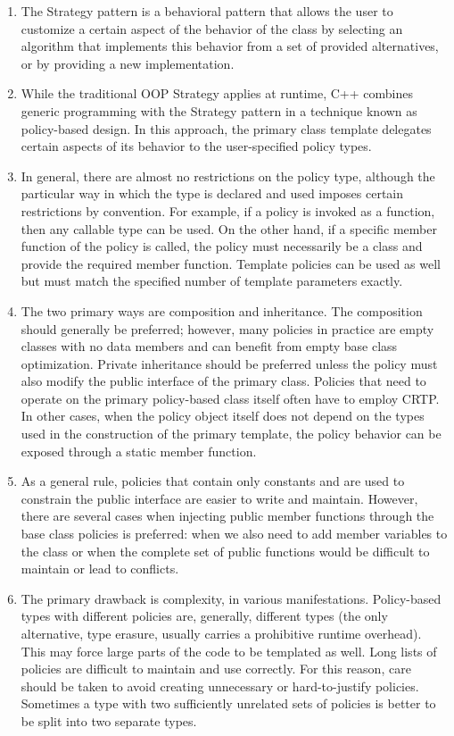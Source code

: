 \begin{enumerate}
\item
  The Strategy pattern is a behavioral pattern that allows the user to customize a certain aspect of the behavior of the class by selecting an algorithm that implements this behavior from a set of provided alternatives, or by providing a new implementation.
\item
  While the traditional OOP Strategy applies at runtime, C++ combines generic programming with the Strategy pattern in a technique known as policy-based design. In this approach, the primary class template delegates certain aspects of its behavior to the user-specified policy types.
\item
  In general, there are almost no restrictions on the policy type, although the particular way in which the type is declared and used imposes certain restrictions by convention. For example, if a policy is invoked as a function, then any callable type can be used. On the other hand, if a specific member function of the policy is called, the policy must necessarily be a class and provide the required member function. Template policies can be used as well but must match the specified number of template parameters exactly.
\item
  The two primary ways are composition and inheritance. The composition should generally be preferred; however, many policies in practice are empty classes with no data members and can benefit from empty base class optimization. Private inheritance should be preferred unless the policy must also modify the public interface of the primary class. Policies that need to operate on the primary policy-based class itself often have to employ CRTP. In other cases, when the policy object itself does not depend on the types used in the construction of the primary template, the policy behavior can be exposed through a static member function.
\item
  As a general rule, policies that contain only constants and are used to constrain the public interface are easier to write and maintain. However, there are several cases when injecting public member functions through the base class policies is preferred: when we also need to add member variables to the class or when the complete set of public functions would be difficult to maintain or lead to conflicts.
\item
  The primary drawback is complexity, in various manifestations. Policy-based types with different policies are, generally, different types (the only alternative, type erasure, usually carries a prohibitive runtime overhead). This may force large parts of the code to be templated as well. Long lists of policies are difficult to maintain and use correctly. For this reason, care should be taken to avoid creating unnecessary or hard-to-justify policies. Sometimes a type with two sufficiently unrelated sets of policies is better to be split into two separate types.
\end{enumerate}

